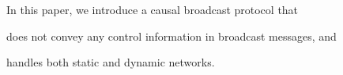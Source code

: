 


In this paper, we introduce a causal broadcast protocol that
\begin{inparaenum}[(i)]
\item does not convey any control information in broadcast messages, and 
\item handles both static and dynamic networks.
\end{inparaenum}


